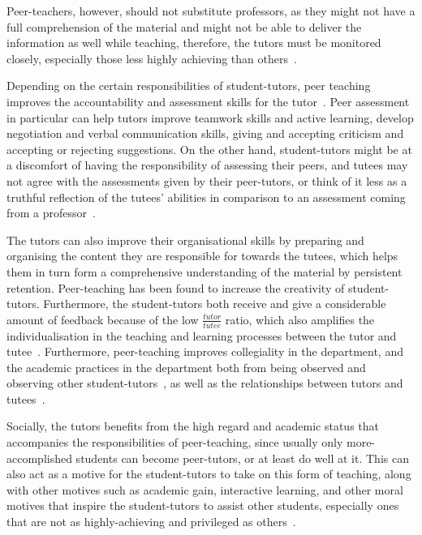 \documentclass[12pt,helvetica,a4paper,final]{iopart}
\begin{document}
\par{}
Peer-teachers, however, should not substitute professors, as they might not have a full comprehension of the material and might not be able to deliver the information as well while teaching, therefore, the tutors must be monitored closely, especially those less highly achieving than others~\cite{theory}.

\par{}
Depending on the certain responsibilities of student-tutors, peer teaching improves the accountability and assessment skills for the tutor~\cite{colvin}. Peer assessment in particular can help tutors improve teamwork skills and active learning, develop negotiation and verbal communication skills, giving and accepting criticism and
accepting or rejecting suggestions. On the other hand, student-tutors might be at a discomfort of having the responsibility of assessing their peers, and tutees may not agree with the assessments given by their peer-tutors, or think of it less as a truthful reflection of the tutees' abilities in comparison to an assessment coming from a professor~\cite{keith}.

\par{}
The tutors can also improve their organisational skills by preparing and organising the content they are responsible for towards the tutees, which helps them in turn form a comprehensive understanding of the material by persistent retention. Peer-teaching has been found to increase the creativity of student-tutors. Furthermore, the student-tutors both receive and give a considerable amount of feedback because of the low $\frac{tutor}{tutee}$ ratio, which also amplifies the individualisation in the teaching and learning processes between the tutor and tutee~\cite{theory}. Furthermore, peer-teaching improves collegiality in the department, and the academic practices in the department both from being observed and observing other student-tutors~\cite{double}, as well as the relationships between tutors and tutees~\cite{longauthorlist}.

\par{}
Socially, the tutors benefits from the high regard and academic status that accompanies the responsibilities of peer-teaching, since usually only more-accomplished students can become peer-tutors, or at least do well at it. This can also act as a motive for the student-tutors to take on this form of teaching, along with other motives such as academic gain, interactive learning, and other moral motives that inspire the student-tutors to assist other students, especially ones that are not as highly-achieving and privileged as others~\cite{theory}.
\end{document}
